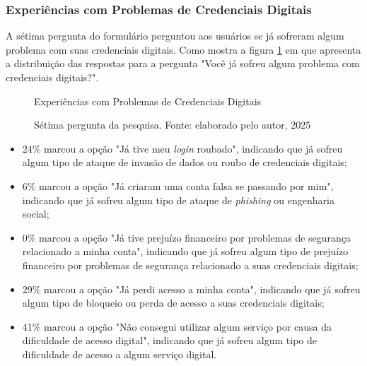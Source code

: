 \documentclass[12pt]{article}
\begin{document}
\subsubsection{Experiências com Problemas de Credenciais Digitais}

A sétima pergunta do formulário perguntou aos usuários se já sofreram algum problema com
suas credenciais digitais.
Como mostra a figura \ref{fig:resposta_7} em que apresenta a distribuição das
respostas para a pergunta "Você já sofreu algum problema com credenciais digitais?".

\begin{figure}[!htbp]
  \centering
  \caption*{\normalfont Experiências com Problemas de Credenciais Digitais}
  \caption{Sétima pergunta da pesquisa. Fonte: elaborado pelo autor, 2025}
  \label{fig:resposta_7}
\end{figure}
\FloatBarrier

\begin{itemize}
  \item 24\% marcou a opção "Já tive meu \textit{login} roubado", indicando que já sofreu algum tipo
  de ataque de invasão de dados ou roubo de credenciais digitais;

  \item 6\% marcou a opção "Já criaram uma conta falsa se passando por mim", indicando que
  já sofreu algum tipo de ataque de \textit{phishing} ou engenharia social;

  \item 0\% marcou a opção "Já tive prejuízo financeiro por problemas de segurança relacionado
  a minha conta", indicando que já sofreu algum tipo de prejuízo financeiro por problemas de
  segurança relacionado a suas credenciais digitais;

  \item 29\% marcou a opção "Já perdi acesso a minha conta", indicando que já sofreu algum
  tipo de bloqueio ou perda de acesso a suas credenciais digitais;

  \item 41\% marcou a opção "Não consegui utilizar algum serviço por causa da dificuldade de
  acesso digital", indicando que já sofreu algum tipo de dificuldade de acesso a algum serviço
  digital.
\end{itemize}
\end{document}
